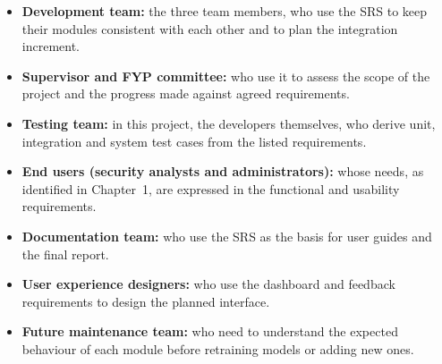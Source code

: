 \begin{itemize}
    \setlength{\itemsep}{1pt}
    \setlength{\parskip}{0pt}
    \setlength{\parsep}{0pt}
    \item \textbf{Development team:} the three team members, who use the SRS to keep their modules consistent with each other and to plan the integration increment.
    \item \textbf{Supervisor and FYP committee:} who use it to assess the scope of the project and the progress made against agreed requirements.
    \item \textbf{Testing team:} in this project, the developers themselves, who derive unit, integration and system test cases from the listed requirements.
    \item \textbf{End users (security analysts and administrators):} whose needs, as identified in Chapter~1, are expressed in the functional and usability requirements.
    \item \textbf{Documentation team:} who use the SRS as the basis for user guides and the final report.
    \item \textbf{User experience designers:} who use the dashboard and feedback requirements to design the planned interface.
    \item \textbf{Future maintenance team:} who need to understand the expected behaviour of each module before retraining models or adding new ones.
\end{itemize}
